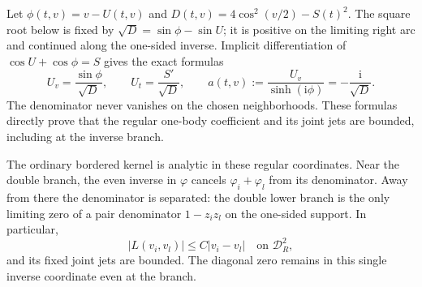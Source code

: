 \documentclass[11pt]{article}
\numberwithin{equation}{section}
\theoremstyle{remark}\newtheorem{remark}[theorem]{Remark}
\newcommand{\ii}{\mathrm i}
\begin{document}
Let $\phi(t,v)=v-U(t,v)$ and
$D(t,v)=4\cos^2(v/2)-S(t)^2$.
The square root below is fixed by
$\sqrt D=\sin\phi-\sin U$; it is positive on the limiting right
arc and continued along the one-sided inverse. Implicit differentiation
of $\cos U+\cos\phi=S$ gives the exact formulas
\begin{equation}\label{eq:regular-explicit}
 U_v=\frac{\sin\phi}{\sqrt D},\qquad
 U_t=\frac{S'}{\sqrt D},\qquad
 a(t,v):=\frac{U_v}{\sinh(\ii\phi)}=-\frac{\ii}{\sqrt D}.
\end{equation}
The denominator never vanishes on the chosen neighborhoods.
These formulas directly prove that the regular one-body coefficient
and its joint jets are bounded, including at the inverse branch.

The ordinary bordered kernel is analytic in these regular coordinates.
Near the double branch, the even inverse in $\varphi$ cancels
$\varphi_i+\varphi_l$ from its denominator. Away from there the
denominator is separated: the double lower branch is the only limiting
zero of a pair denominator $1-z_i z_l$ on the one-sided support.
In particular,
\begin{equation}\label{eq:v-3}
 |L(v_i,v_l)|\le C|v_i-v_l|\quad\text{on }\mathcal D_R^2,
\end{equation}
and its fixed joint jets are bounded. The diagonal zero remains
in this single inverse coordinate even at the branch.
\end{document}
